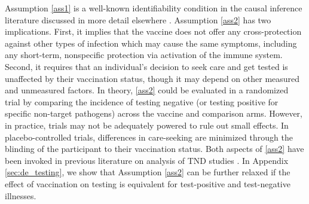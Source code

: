 \documentclass[11pt]{article}
\begin{document}
Assumption \ref{ass1} is a well-known identifiability condition in the causal inference literature discussed in more detail elsewhere \cite{hernan_causal_2020}. Assumption \ref{ass2} has two implications. First, it implies that the vaccine does not offer any cross-protection against other types of infection which may cause the same symptoms, including any short-term, nonspecific protection via activation of the immune system. Second, it requires that an individual's decision to seek care and get tested is unaffected by their vaccination status, though it may depend on other measured and unmeasured factors. In theory, \ref{ass2} could be evaluated in a randomized trial by comparing the incidence of testing negative (or testing positive for specific non-target pathogens) across the vaccine and comparison arms. However, in practice, trials may not be adequately powered to rule out small effects. In placebo-controlled trials, differences in care-seeking are minimized through the blinding of the participant to their vaccination status. Both aspects of \ref{ass2} have been invoked in previous literature on analysis of TND studies \cite{jackson_test-negative_2013,feng_assessment_2017,schnitzer_estimands_2022}. In Appendix \ref{sec:de_testing}, we show that Assumption \ref{ass2} can be further relaxed if the effect of vaccination on testing is equivalent for test-positive and test-negative illnesses.
\end{document}
